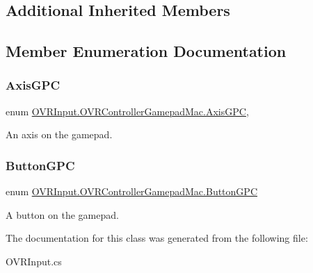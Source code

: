 \subsection*{Additional Inherited Members}


\subsection{Member Enumeration Documentation}
\mbox{\label{class_o_v_r_input_1_1_o_v_r_controller_gamepad_mac_a5d7930d843822a84bc51f463887346e9}} 
\subsubsection{\texorpdfstring{Axis\+G\+PC}{AxisGPC}}
{\footnotesize\ttfamily enum \mbox{\hyperlink{class_o_v_r_input_1_1_o_v_r_controller_gamepad_mac_a5d7930d843822a84bc51f463887346e9}{O\+V\+R\+Input.\+O\+V\+R\+Controller\+Gamepad\+Mac.\+Axis\+G\+PC}}\hspace{0.3cm}{\ttfamily [strong]}, {\ttfamily [private]}}



An axis on the gamepad. 

\mbox{\label{class_o_v_r_input_1_1_o_v_r_controller_gamepad_mac_af829fe743d6bc1789f834884cdd9d9f7}} 
\subsubsection{\texorpdfstring{Button\+G\+PC}{ButtonGPC}}
{\footnotesize\ttfamily enum \mbox{\hyperlink{class_o_v_r_input_1_1_o_v_r_controller_gamepad_mac_af829fe743d6bc1789f834884cdd9d9f7}{O\+V\+R\+Input.\+O\+V\+R\+Controller\+Gamepad\+Mac.\+Button\+G\+PC}}\hspace{0.3cm}{\ttfamily [strong]}}



A button on the gamepad. 



The documentation for this class was generated from the following file\+:\begin{DoxyCompactItemize}
\item 
O\+V\+R\+Input.\+cs\end{DoxyCompactItemize}

